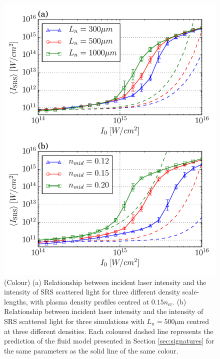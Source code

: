 \begin{figure}[!ht]
     \centering
    \includegraphics[width=0.75\columnwidth]{Chapters/C4_iSRS/fig6_6a_6b.pdf}
    \caption{
    (Colour) (a)  Relationship between incident laser intensity and the intensity of SRS scattered light for three different density scale-lengths, with plasma density profiles centred at $0.15n_\mathrm{cr}$.
    (b) Relationship between incident laser intensity and the intensity of SRS scattered light for three simulations with $L_n=500\si{\micro\metre}$ centred at three different densities.
    Each coloured dashed line represents the prediction of the fluid model presented in Section \ref{sec:signatures} for the same parameters as the solid line of the same colour.
    }
    \label{fig:paramScan}
\end{figure}


